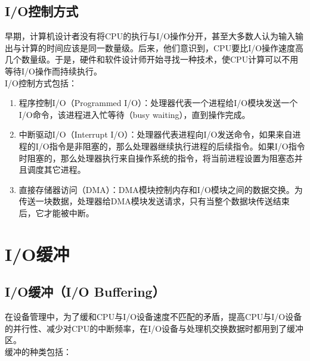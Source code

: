 \subsection{I/O控制方式}

早期，计算机设计者没有将CPU的执行与I/O操作分开，甚至大多数人认为输入输出与计算的时间应该是同一数量级。后来，他们意识到，CPU要比I/O操作速度高几个数量级。于是，硬件和软件设计师开始寻找一种技术，使CPU计算可以不用等待I/O操作而持续执行。 \\

I/O控制方式包括：

\begin{enumerate}
	\item 程序控制I/O（Programmed I/O）：处理器代表一个进程给I/O模块发送一个I/O命令，该进程进入忙等待（busy waiting），直到操作完成。

	\item 中断驱动I/O（Interrupt I/O）：处理器代表进程向I/O发送命令，如果来自进程的I/O指令是非阻塞的，那么处理器继续执行进程的后续指令。如果I/O指令时阻塞的，那么处理器执行来自操作系统的指令，将当前进程设置为阻塞态并且调度其它进程。

	\item 直接存储器访问（DMA）：DMA模块控制内存和I/O模块之间的数据交换。为传送一块数据，处理器给DMA模块发送请求，只有当整个数据块传送结束后，它才能被中断。
\end{enumerate}

\newpage

\section{I/O缓冲}

\subsection{I/O缓冲（I/O Buffering）}

在设备管理中，为了缓和CPU与I/O设备速度不匹配的矛盾，提高CPU与I/O设备的并行性、减少对CPU的中断频率，在I/O设备与处理机交换数据时都用到了缓冲区。 \\

缓冲的种类包括：

